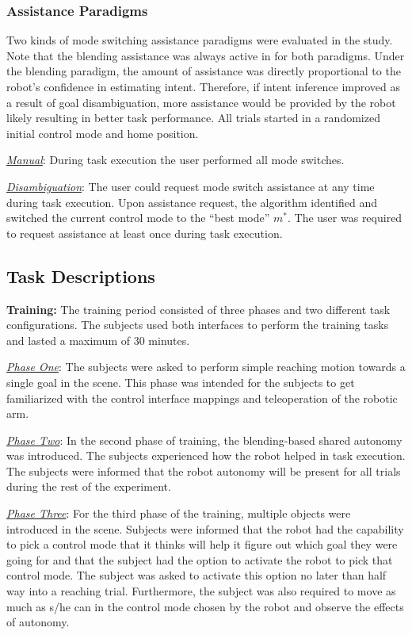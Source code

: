 \subsubsection{Assistance Paradigms}
Two kinds of mode switching assistance paradigms were evaluated in the study. Note that the blending assistance was always active in for both paradigms. Under the blending paradigm, the amount of assistance was directly proportional to the robot's confidence in estimating intent. Therefore, if intent inference improved as a result of goal disambiguation, more assistance would be provided by the robot likely resulting in better task performance. All trials started in a randomized initial control mode and home position. 

\noindent\underline{\textit{Manual}}: During task execution the user performed all mode switches. 

\noindent\underline{\textit{Disambiguation}}: The user could request mode switch assistance at any time during task execution. Upon assistance request, the algorithm identified and switched the current control mode to the ``best mode'' $m^*$. The user was required to request assistance at least once during task execution.  
\subsection{Task Descriptions}


\textbf{Training:} The training period consisted of three phases and two different task configurations. The subjects used both interfaces to perform the training tasks and lasted a maximum of 30 minutes.	

\noindent\underline{\textit{Phase One}}: The subjects were asked to perform simple reaching motion towards a single goal in the scene. This phase was intended for the subjects to get familiarized with the control interface mappings and teleoperation of the robotic arm. 

\noindent\underline{\textit{Phase Two}}: In the second phase of training, the blending-based shared autonomy was introduced. The subjects experienced how the robot helped in task execution. The subjects were informed that the robot autonomy will be present for all trials during the rest of the experiment. 

\noindent\underline{\textit{Phase Three}}: For the third phase of the training, multiple objects were introduced in the scene. 
Subjects were informed that the robot had the capability to pick a control mode that it thinks will help it figure out which goal they were going for and that the subject had the option to activate the robot to pick that control mode. 
 The subject was asked to activate this option no later than half way into a reaching trial. Furthermore, the subject was also required to move as much as s/he can in the control mode chosen by the robot and observe the effects of autonomy. 


